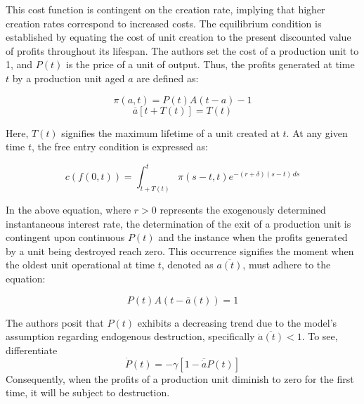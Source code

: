 \documentclass[12pt]{article}
\begin{document}
This cost function is contingent on the creation rate, implying that higher creation rates correspond to increased
costs. The equilibrium condition is established by equating the cost of unit creation to the present discounted value of
profits throughout its lifespan. The authors set the cost of a production unit to 1, and \(P(t)\) is the price of a unit
of output. Thus, the profits generated at time \(t\) by a production unit aged \(a\) are defined as: 

\[\pi(a,t)= P(t)A(t-a)-1\]
\[\overline{a}[t+T(t)] = T(t)\]

Here, \(T(t)\) signifies the maximum lifetime of a unit created at \(t\). At any given time \(t\), the free entry
condition is expressed as: 

\[ c(f(0,t)) = \int_{t+T(t)}^{t}\pi(s-t,t)e^{-(r+\delta)(s-t)\,ds} \]

In the above equation, where \(r>0\) represents the exogenously determined instantaneous interest rate, the determination of
the exit of a production unit is contingent upon continuous \(P(t)\) and the instance when the profits generated by a
unit being destroyed reach zero. This occurrence signifies the moment when the oldest unit operational at time \(t\),
denoted as \(\overline{a(t)}\), must adhere to the equation: 

\[P(t)A(t-\overline{a}(t))=1\]

The authors posit that \(P(t)\) exhibits a decreasing trend due to the model's assumption regarding endogenous
destruction, specifically \(\overline{\dot{a}(t)}<1\). To see, differentiate 
\[\dot{P}(t)=-\gamma\left[1-\overline{\dot{a}}P(t)\right]\]
Consequently, when the profits of a production unit diminish to
zero for the first time, it will be subject to destruction. 
\end{document}
